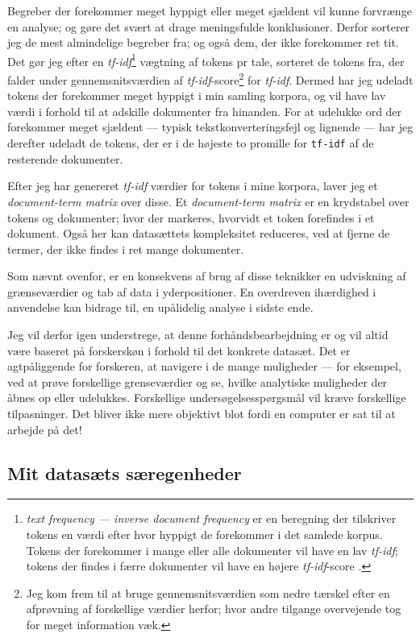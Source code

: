 Begreber der forekommer meget hyppigt eller meget sjældent vil kunne forvrænge en analyse; og gøre det svært at drage meningsfulde konklusioner.
Derfor sorterer jeg de mest almindelige begreber fra; og også dem, der ikke forekommer ret tit.
Det gør jeg efter en \textit{tf-idf}\footnote{\textit{text frequency — inverse document frequency} er en beregning der tilskriver tokens en værdi efter hvor hyppigt de forekommer i det samlede korpus.
Tokens der forekommer i mange eller alle dokumenter vil have en lav \textit{tf-idf}; tokens der findes i færre dokumenter vil have en højere \textit{tf-idf}-score \autocite[s. 29]{silgeTextMiningTidy2017}.} vægtning af tokens pr tale, sorteret de tokens fra, der falder under gennemsnitsværdien af \textit{tf-idf}-score\footnote{Jeg kom frem til at bruge gennemsnitsværdien som nedre tærskel efter en afprøvning af forskellige værdier herfor; hvor andre tilgange overvejende tog for meget information væk.} for \textit{tf-idf}.
Dermed har jeg udeladt tokens der forekommer meget hyppigt i min samling korpora, og vil have lav værdi i forhold til at adskille dokumenter fra hinanden.
For at udelukke ord der forekommer meget sjældent — typisk tekstkonverteringsfejl og lignende — har jeg derefter udeladt de tokens, der er i de højeste to promille for \texttt{tf-idf} af de resterende dokumenter.

Efter jeg har genereret \textit{tf-idf} værdier for tokens i mine korpora, laver jeg et \textit{document-term matrix} over disse.
Et \textit{document-term matrix} er en krydstabel over tokens og dokumenter; hvor der markeres, hvorvidt et token forefindes i et dokument.
Også her kan datasættets kompleksitet reduceres, ved at fjerne de termer, der ikke findes i ret mange dokumenter.

Som nævnt ovenfor, er en konsekvens af brug af disse teknikker en udviskning af grænseværdier og tab af data i yderpositioner.
En overdreven ihærdighed i anvendelse kan bidrage til, en upålidelig analyse i sidste ende.

Jeg vil derfor igen understrege, at denne forhåndsbearbejdning er og vil altid være baseret på forskerskøn i forhold til det konkrete datasæt.
Det er agtpåliggende for forskeren, at navigere i de mange muligheder — for eksempel, ved at prøve forskellige grenseværdier og se, hvilke analytiske muligheder der åbnes op eller udelukkes.
Forskellige undersøgelsesspørgsmål vil kræve forskellige tilpasninger.
Det bliver ikke mere objektivt blot fordi en computer er sat til at arbejde på det!

\subsection{Mit datasæts særegenheder}

